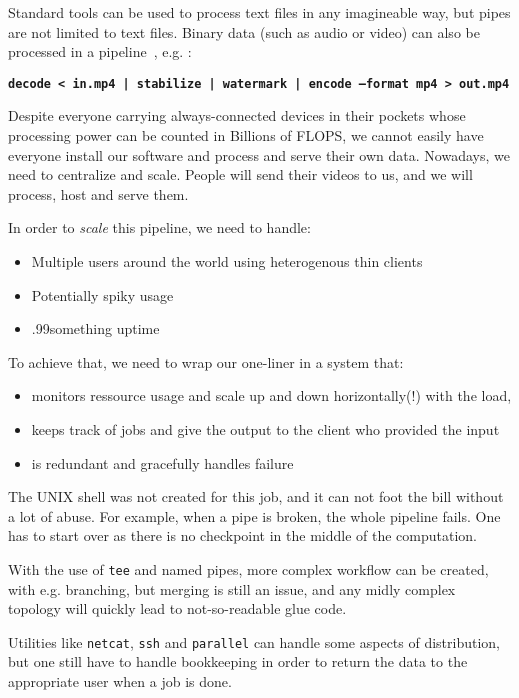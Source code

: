 \documentclass[letterpaper,twocolumn,10pt]{article}
\begin{document}
Standard tools can be used to process text files in any imagineable way, but pipes are not limited to text files. Binary data (such as audio or video) can also be processed in a pipeline~\cite{ffmpeg,audio}, e.g. :

{\bf \tt decode < in.mp4 | stabilize | watermark | encode --format mp4 > out.mp4 \\}

Despite everyone carrying always-connected devices in their pockets whose processing power can be counted in Billions of FLOPS, we cannot easily have everyone install our software and process and serve their own data. Nowadays, we need to centralize and scale. People will send their videos to us, and we will process, host and serve them.

In order to \emph{scale} this pipeline, we need to handle:
\begin{itemize}
\item Multiple users around the world using heterogenous thin clients
\item Potentially spiky usage
\item .99something uptime
\end{itemize}

To achieve that, we need to wrap our one-liner in a system that:
\begin{itemize}
\item monitors ressource usage and scale up and down horizontally(!) with the load,
\item keeps track of jobs and give the output to the client who provided the input
\item is redundant and gracefully handles failure
\end{itemize}

The UNIX shell was not created for this job, and it can not foot the bill without a lot of abuse. For example, when a pipe is broken, the whole pipeline fails. One has to start over as there is no checkpoint in the middle of the computation.

With the use of {\tt tee} and named pipes, more complex workflow can be created, with e.g. branching, but merging is still an issue, and any midly complex topology will quickly lead to not-so-readable glue code.

Utilities like {\tt netcat}, {\tt ssh} and {\tt parallel} can handle some aspects of distribution, but one still have to handle bookkeeping in order to return the data to the appropriate user when a job is done.
\end{document}
